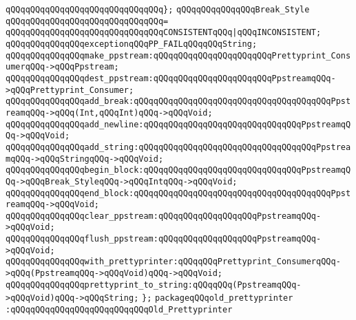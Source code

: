 \verb|qQQqqQQqqQQqqQQqqQQqqQQqqQQqqQQq};|\newline
\newline
\verb|qQQqqQQqqQQqqQQqBreak_Style|\newline
\verb|qQQqqQQqqQQqqQQqqQQqqQQqqQQqqQQq=|\newline
\verb|qQQqqQQqqQQqqQQqqQQqqQQqqQQqqQQqCONSISTENTqQQq|\verb#|qQQqINCONSISTENT;#\newline
\newline
\verb|qQQqqQQqqQQqqQQqexceptionqQQqPP_FAILqQQqqQQqString;|\newline
\newline
\verb|qQQqqQQqqQQqqQQqmake_ppstream:qQQqqQQqqQQqqQQqqQQqqQQqPrettyprint_ConsumerqQQq->qQQqPpstream;|\newline
\verb|qQQqqQQqqQQqqQQqdest_ppstream:qQQqqQQqqQQqqQQqqQQqqQQqPpstreamqQQq->qQQqPrettyprint_Consumer;|\newline
\verb|qQQqqQQqqQQqqQQqadd_break:qQQqqQQqqQQqqQQqqQQqqQQqqQQqqQQqqQQqqQQqPpstreamqQQq->qQQq(Int,qQQqInt)qQQq->qQQqVoid;|\newline
\verb|qQQqqQQqqQQqqQQqadd_newline:qQQqqQQqqQQqqQQqqQQqqQQqqQQqqQQqPpstreamqQQq->qQQqVoid;|\newline
\verb|qQQqqQQqqQQqqQQqadd_string:qQQqqQQqqQQqqQQqqQQqqQQqqQQqqQQqqQQqPpstreamqQQq->qQQqStringqQQq->qQQqVoid;|\newline
\verb|qQQqqQQqqQQqqQQqbegin_block:qQQqqQQqqQQqqQQqqQQqqQQqqQQqqQQqPpstreamqQQq->qQQqBreak_StyleqQQq->qQQqIntqQQq->qQQqVoid;|\newline
\verb|qQQqqQQqqQQqqQQqend_block:qQQqqQQqqQQqqQQqqQQqqQQqqQQqqQQqqQQqqQQqPpstreamqQQq->qQQqVoid;|\newline
\verb|qQQqqQQqqQQqqQQqclear_ppstream:qQQqqQQqqQQqqQQqqQQqPpstreamqQQq->qQQqVoid;|\newline
\verb|qQQqqQQqqQQqqQQqflush_ppstream:qQQqqQQqqQQqqQQqqQQqPpstreamqQQq->qQQqVoid;|\newline
\newline
\verb|qQQqqQQqqQQqqQQqwith_prettyprinter:qQQqqQQqPrettyprint_ConsumerqQQq->qQQq(PpstreamqQQq->qQQqVoid)qQQq->qQQqVoid;|\newline
\verb|qQQqqQQqqQQqqQQqprettyprint_to_string:qQQqqQQq(PpstreamqQQq->qQQqVoid)qQQq->qQQqString;|\newline
\newline
\verb|};|\newline
\newline
\verb|packageqQQqold_prettyprinter|\newline
\verb|:qQQqqQQqqQQqqQQqqQQqqQQqqQQqOld_Prettyprinter|\newline
